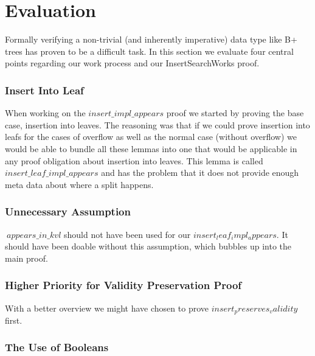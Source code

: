 \section{Evaluation}
\label{sec:Evaluation}
Formally verifying a non-trivial (and inherently imperative) data type like B+ trees has proven to be a difficult task. In this section we evaluate four central points regarding our work process and our InsertSearchWorks proof.
\subsubsection{Insert Into Leaf}
When working on the $insert\_impl\_appears$ proof we started by proving the base case, insertion into leaves. The reasoning was that if we could prove insertion into leafs for the cases of overflow as well as the normal case (without overflow) we would be able to bundle all these lemmas into one that would be applicable in any proof obligation about insertion into leaves. This lemma is called $insert\_leaf\_impl\_appears$ and has the problem that it does not provide enough meta data about where a split happens.
\subsubsection{Unnecessary Assumption}
$~appears\_in\_kvl$ should not have been used for our $insert_leaf_impl_appears$. It should have been doable without this assumption, which bubbles up into the main proof.
\subsubsection{Higher Priority for Validity Preservation Proof}
With a better overview we might have chosen to prove $insert_preserves_validity$ first.
\subsubsection{The Use of Booleans}
